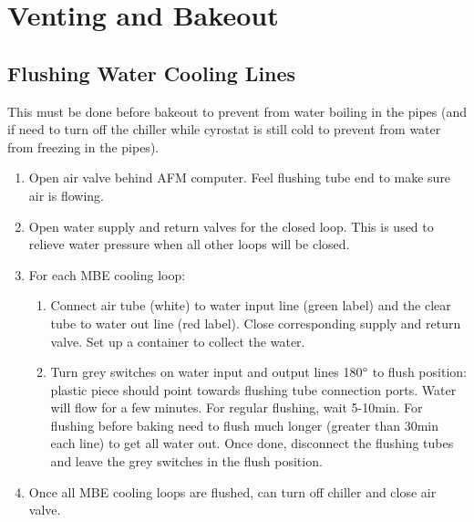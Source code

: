 \chapter{Venting and Bakeout}
\section{Flushing Water Cooling Lines}
This must be done before bakeout to prevent from water boiling in the pipes (and if need to turn off the chiller while cyrostat is still cold to prevent from water from freezing in the pipes).
\begin{enumerate}
\item	Open air valve behind AFM computer. Feel flushing tube end to make sure air is flowing.
\item	Open water supply and return valves for the closed loop. This is used to relieve water pressure when all other loops will be closed.
\item	For each MBE cooling loop:
\begin{enumerate}
\item	Connect air tube (white) to water input line (green label) and the clear tube to water out line (red label).  Close corresponding supply and return valve. Set up a container to collect the water.
\item	Turn grey switches on water input and output lines 180$\degree$ to flush position: plastic piece should point towards flushing tube connection ports. Water will flow for a few minutes. For regular flushing, wait 5-10min. For flushing before baking need to flush much longer (greater than 30min each line) to get all water out. Once done, disconnect the flushing tubes and leave the grey switches in the flush position. 
\end{enumerate}
\item	Once all MBE cooling loops are flushed, can turn off chiller and close air valve.
\end{enumerate}

